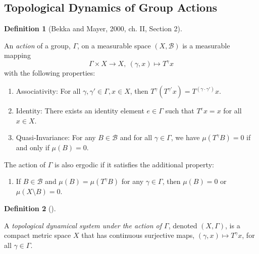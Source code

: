 \documentclass[
  british,
]{article}
\providecommand{\tightlist}{%
  \setlength{\itemsep}{0pt}\setlength{\parskip}{0pt}}
\theoremstyle{definition}
\newtheorem{definition}{Definition}[section]
\theoremstyle{plain}
\theoremstyle{plain}
\theoremstyle{plain}
\theoremstyle{remark}
\newcommand{\Group}{{\Gamma}}
\newcommand{\GroupAction}[2]{T^{#1}{#2}}
\newcommand{\GroupElement}{{\gamma}}
\newcommand{\GroupIdentity}{{e}}
\newcommand{\GroupOperation}[2]{{#1}\cdot{#2}}
\newcommand{\Measure}{{\mu}}
\newcommand{\SigmaAlgebra}[1]{{\mathscr{#1}}}
\begin{document}
\subsection{Topological Dynamics of Group
Actions}\label{topological-dynamics-of-group-actions}

\begin{definition}[{Bekka and Mayer, 2000, ch. II, Section
2}]\protect\hypertarget{def-ActionDef}{}\label{def-ActionDef}

An \emph{action} of a group, \(\Group\), on a measurable space
\((X,\SigmaAlgebra{B})\) is a measurable mapping
\[\Group\times X\rightarrow X,\ (\GroupElement,x)\mapsto \GroupAction{\GroupElement}{x} \]
with the following properties:

\begin{enumerate}
\def\labelenumi{\arabic{enumi}.}
\tightlist
\item
  Associativity: For all
  \(\GroupElement,\GroupElement'\in \Group,x\in X\), then
  \(\GroupAction{\GroupElement}{(\GroupAction{\GroupElement'}{x})}=\GroupAction{(\GroupOperation{\GroupElement}{\GroupElement'})}{x}\).
\item
  Identity: There exists an identity element \(\GroupIdentity\in\Group\)
  such that \(\GroupAction{\GroupIdentity}{x}=x\) for all \(x\in X\).
\item
  Quasi-Invariance: For any \(B\in\SigmaAlgebra{B}\) and for all
  \(\GroupElement\in\Group\), we have
  \(\Measure(\GroupAction{\GroupElement}{B})=0\) if and only if
  \(\Measure(B)=0\).
\end{enumerate}

The action of \(\Group\) is also ergodic if it satisfies the additional
property:

\begin{enumerate}
\def\labelenumi{\arabic{enumi}.}
\setcounter{enumi}{3}
\tightlist
\item
  If \(B\in\SigmaAlgebra{B}\) and
  \(\Measure(B)=\Measure(\GroupAction{\GroupElement}{B})\) for any
  \(\GroupElement\in\Group\), then \(\Measure(B)=0\) or
  \(\Measure(X\setminus B)=0\).
\end{enumerate}

\end{definition}

\begin{definition}[]\protect\hypertarget{def-TopologicalDynamicSystemsDef}{}\label{def-TopologicalDynamicSystemsDef}

A \emph{topological dynamical system under the action of \(\Group\)},
denoted \((X,\Group)\), is a compact metric space \(X\) that has
continuous surjective maps,
\((\GroupElement,x)\mapsto \GroupAction{\GroupElement}{x}\), for all
\(\GroupElement\in\Group\).

\end{definition}
\end{document}
